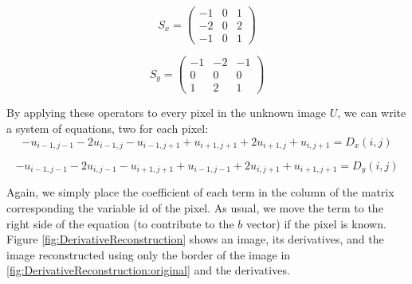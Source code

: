 \documentclass{InsightArticle}
\begin{document}
\begin{figure}[H]
  \begin{minipage}[b]{0.5\linewidth}
    \centering

    \begin{equation}
    S_x =
    \begin{pmatrix}
    -1 & 0 & 1 \\
    -2 & 0 & 2\\
    -1 & 0 & 1
    \end{pmatrix}
    \end{equation}

  \end{minipage}
    \hspace{0.5cm}
  \begin{minipage}[b]{0.5\linewidth}

    \begin{equation}
    S_y =
    \begin{pmatrix}
    -1 & -2 & -1 \\
    0 & 0 & 0\\
    1 & 2 & 1
    \end{pmatrix}
    \end{equation}

  \end{minipage}
\end{figure}

By applying these operators to every pixel in the unknown image $U$, we can write a system of equations, two for each pixel:
\begin{equation}
- u_{i-1,j-1} -2 u_{i-1,j} - u_{i-1,j+1} + u_{i+1,j+1} + 2 u_{i+1,j} + u_{i,j+1} = D_x(i,j)
\end{equation}

\begin{equation}
- u_{i-1,j-1} -2 u_{i,j-1} - u_{i+1,j+1} + u_{i-1,j-1} + 2 u_{i,j+1} + u_{i+1,j+1} = D_y(i,j)
\end{equation}

Again, we simply place the coefficient of each term in the column of the matrix corresponding the variable id of the pixel. As usual, we move the term to the right side of the equation (to contribute to the $b$ vector) if the pixel is known. Figure \ref{fig:DerivativeReconstruction} shows an image, its derivatives, and the image reconstructed using only the border of the image in \ref{fig:DerivativeReconstruction:original} and the derivatives.
\end{document}
